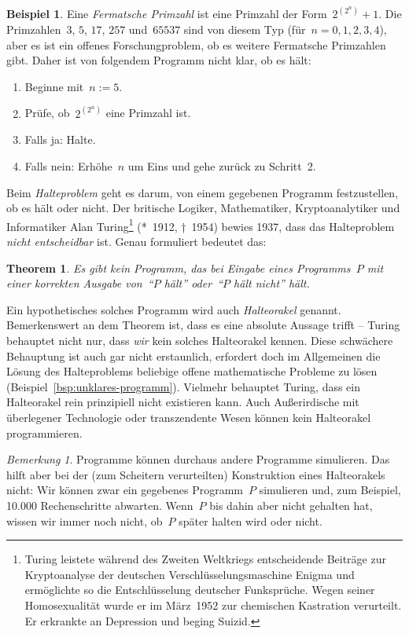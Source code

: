 \documentclass[twoside]{../zirkelblatt1415}
\theoremstyle{definition}
\newtheorem{bsp}[defn]{Beispiel}
\theoremstyle{plain}
\newtheorem{thm}[defn]{Theorem}
\theoremstyle{remark}
\newtheorem{bem}[defn]{Bemerkung}
\newenvironment{listing}{
  \renewcommand*\theenumi{\arabic{enumi}}
  \renewcommand{\labelenumi}{\theenumi.}
  \begin{enumerate}\itemsep0em}{\end{enumerate}}
\begin{document}
\begin{bsp}Eine \emph{Fermatsche Primzahl} ist eine Primzahl der
Form~$2^{(2^n)} + 1$. Die Primzahlen~$3$, $5$, $17$, $257$ und~$65537$ sind von
diesem Typ (für~$n = 0,1,2,3,4$), aber es ist ein offenes Forschungproblem, ob
es weitere Fermatsche Primzahlen gibt. Daher ist von folgendem Programm nicht
klar, ob es hält:
\begin{listing}
\item[1.] Beginne mit~$n := 5$.
\item[2.] Prüfe, ob~$2^{(2^n)}$ eine Primzahl ist.
\item[3.] Falls ja: Halte.
\item[4.] Falls nein: Erhöhe~$n$ um Eins und gehe zurück zu Schritt~2.
\end{listing}
\end{bsp}

Beim \emph{Halteproblem} geht es darum, von einem gegebenen Programm
festzustellen, ob es hält oder nicht. Der britische Logiker, Mathematiker,
Kryptoanalytiker und Informatiker Alan Turing\footnote{Turing leistete während des
Zweiten Weltkriegs entscheidende Beiträge zur Kryptoanalyse der
deutschen Verschlüsselungsmaschine Enigma und ermöglichte so die
Entschlüsselung deutscher Funksprüche. Wegen seiner Homosexualität wurde er
im März~1952 zur chemischen Kastration verurteilt. Er erkrankte an
Depression und beging Suizid.} (*~1912, †~1954) bewies 1937, dass das Halteproblem
\emph{nicht entscheidbar} ist. Genau formuliert bedeutet das:

\begin{thm}Es gibt kein Programm, das bei Eingabe eines Programms~$P$ mit einer
korrekten Ausgabe von~"`$P$ hält"' oder~"`$P$ hält nicht"' hält.\end{thm}

Ein hypothetisches solches Programm wird auch \emph{Halteorakel} genannt.
Bemerkenswert an dem Theorem ist, dass es eine absolute Aussage trifft --
Turing behauptet nicht nur, dass \emph{wir} kein solches Halteorakel kennen.
Diese schwächere Behauptung ist auch gar nicht erstaunlich, erfordert doch im
Allgemeinen die Lösung des Halteproblems beliebige offene mathematische
Probleme zu lösen (Beispiel~\ref{bsp:unklares-programm}).
Vielmehr behauptet Turing, dass ein Halteorakel rein prinzipiell nicht
existieren kann. Auch Außerirdische mit überlegener Technologie oder
transzendente Wesen können kein Halteorakel programmieren.

\begin{bem}Programme können durchaus andere Programme simulieren. Das hilft
aber bei der (zum Scheitern verurteilten) Konstruktion eines Halteorakels
nicht: Wir können zwar ein gegebenes Programm~$P$ simulieren und, zum Beispiel,
10.000 Rechenschritte abwarten. Wenn~$P$ bis dahin aber nicht gehalten hat,
wissen wir immer noch nicht, ob~$P$ später halten wird oder nicht.
\end{bem}
\end{document}
